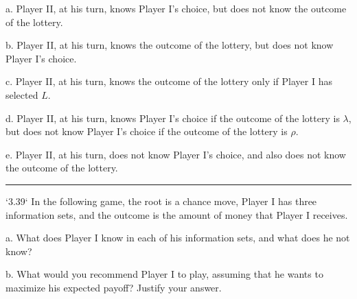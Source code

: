 \documentclass[10pt]{report}
\begin{document}
a. Player II, at his turn, knows Player I's choice, but does not know the outcome of the lottery.

b. Player II, at his turn, knows the outcome of the lottery, but does not know Player I's choice.

c. Player II, at his turn, knows the outcome of the lottery only if Player I has selected $L$.

d. Player II, at his turn, knows Player I's choice if the outcome of the lottery is $\lambda$, but does not know Player I's choice if the outcome of the lottery is $\rho$.

e. Player II, at his turn, does not know Player I's choice, and also does not know the outcome of the lottery.

\vspace{0.5cm}
\hrule
\vspace{0.5cm}
`3.39` In the following game, the root is a chance move, Player I has three information sets, and the outcome is the amount of money that Player I receives.

a. What does Player I know in each of his information sets, and what does he not know?

b. What would you recommend Player I to play, assuming that he wants to maximize his expected payoff? Justify your answer.



\pagebreak
\printbibliography
\end{document}
